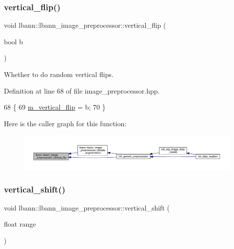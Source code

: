 \subsubsection{\texorpdfstring{vertical\+\_\+flip()}{vertical\_flip()}}
{\footnotesize\ttfamily void lbann\+::lbann\+\_\+image\+\_\+preprocessor\+::vertical\+\_\+flip (\begin{DoxyParamCaption}\item[{bool}]{b }\end{DoxyParamCaption})\hspace{0.3cm}{\ttfamily [inline]}}

Whether to do random vertical flips. 

Definition at line 68 of file image\+\_\+preprocessor.\+hpp.


\begin{DoxyCode}
68                              \{
69     \hyperlink{classlbann_1_1lbann__image__preprocessor_a7cfc687cce450403c7b46460f4d08d69}{m\_vertical\_flip} = b;
70   \}
\end{DoxyCode}
Here is the caller graph for this function\+:\nopagebreak
\begin{figure}[H]
\begin{center}
\leavevmode
\includegraphics[width=350pt]{classlbann_1_1lbann__image__preprocessor_aeb7d75e4d3361ae2836afabc14510d74_icgraph}
\end{center}
\end{figure}
\mbox{\label{classlbann_1_1lbann__image__preprocessor_a50ac63e1f6b1b9806cbf6c06f53f4aca}} 
\subsubsection{\texorpdfstring{vertical\+\_\+shift()}{vertical\_shift()}}
{\footnotesize\ttfamily void lbann\+::lbann\+\_\+image\+\_\+preprocessor\+::vertical\+\_\+shift (\begin{DoxyParamCaption}\item[{float}]{range }\end{DoxyParamCaption})\hspace{0.3cm}{\ttfamily [inline]}}

